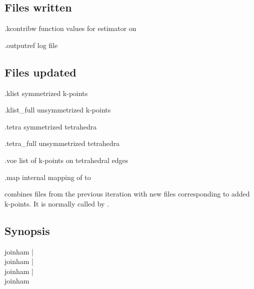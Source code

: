 \subsection{Files written}
\begin{options}
\item[\case.kcontribw] function values for estimator on
\item[\case.outputref] log file
\end{options}

\subsection{Files updated}
\begin{options}
\item[\case.klist] symmetrized k-points
\item[\case.klist\_full] unsymmetrized k-points
\item[\case.tetra] symmetrized tetrahedra
\item[\case.tetra\_full] unsymmetrized tetrahedra
\item[\case.voe] list of k-points on tetrahedral edges
\item[\case.map] internal mapping of  to
\end{options}



\joinham combines  files from the previous iteration with
new files corresponding to added k-points.  It is normally called by
\woprog.

\subsection{Synopsis}
\begin{usage}
  joinham \case                                      |\\
  joinham                  |\\
  joinham      |\\
  joinham      
            
\end{usage}

